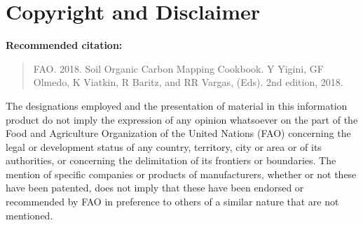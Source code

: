 \documentclass[10pt,b5paper,]{book}
\theoremstyle{definition}
\theoremstyle{definition}
\theoremstyle{definition}
\theoremstyle{remark}
\begin{document}

\frontmatter
{}   

\hypertarget{copyright-and-disclaimer}{%
\chapter*{Copyright and Disclaimer}\label{copyright-and-disclaimer}}

\textbf{Recommended citation:}

\begin{quote}
FAO. 2018. Soil Organic Carbon Mapping Cookbook. Y Yigini, GF Olmedo, K
Viatkin, R Baritz, and RR Vargas, (Eds). 2nd edition, 2018.
\end{quote}

The designations employed and the presentation of material in this
information product do not imply the expression of any opinion
whatsoever on the part of the Food and Agriculture Organization of the
United Nations (FAO) concerning the legal or development status of any
country, territory, city or area or of its authorities, or concerning
the delimitation of its frontiers or boundaries. The mention of specific
companies or products of manufacturers, whether or not these have been
patented, does not imply that these have been endorsed or recommended by
FAO in preference to others of a similar nature that are not mentioned.
\end{document}
